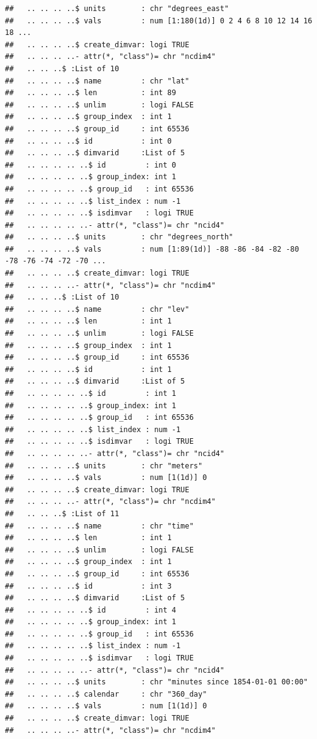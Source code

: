 \documentclass{article}\usepackage[]{graphicx}\usepackage[]{color}
\makeatletter
\newenvironment{kframe}{%
 \def\at@end@of@kframe{}%
 \ifinner\ifhmode%
  \def\at@end@of@kframe{\end{minipage}}%
  \begin{minipage}{\columnwidth}%
 \fi\fi%
 \def\FrameCommand##1{\hskip\@totalleftmargin \hskip-\fboxsep
 \colorbox{shadecolor}{##1}\hskip-\fboxsep
     \hskip-\linewidth \hskip-\@totalleftmargin \hskip\columnwidth}%
 \MakeFramed {\advance\hsize-\width
   \@totalleftmargin\z@ \linewidth\hsize
   \@setminipage}}%
 {\par\unskip\endMakeFramed%
 \at@end@of@kframe}
\newenvironment{knitrout}{}{} %
\makeatother
\begin{document}
\begin{knitrout}
\begin{kframe}
\begin{verbatim}
##   .. .. .. ..$ units        : chr "degrees_east"
##   .. .. .. ..$ vals         : num [1:180(1d)] 0 2 4 6 8 10 12 14 16 18 ...
##   .. .. .. ..$ create_dimvar: logi TRUE
##   .. .. .. ..- attr(*, "class")= chr "ncdim4"
##   .. .. ..$ :List of 10
##   .. .. .. ..$ name         : chr "lat"
##   .. .. .. ..$ len          : int 89
##   .. .. .. ..$ unlim        : logi FALSE
##   .. .. .. ..$ group_index  : int 1
##   .. .. .. ..$ group_id     : int 65536
##   .. .. .. ..$ id           : int 0
##   .. .. .. ..$ dimvarid     :List of 5
##   .. .. .. .. ..$ id         : int 0
##   .. .. .. .. ..$ group_index: int 1
##   .. .. .. .. ..$ group_id   : int 65536
##   .. .. .. .. ..$ list_index : num -1
##   .. .. .. .. ..$ isdimvar   : logi TRUE
##   .. .. .. .. ..- attr(*, "class")= chr "ncid4"
##   .. .. .. ..$ units        : chr "degrees_north"
##   .. .. .. ..$ vals         : num [1:89(1d)] -88 -86 -84 -82 -80 -78 -76 -74 -72 -70 ...
##   .. .. .. ..$ create_dimvar: logi TRUE
##   .. .. .. ..- attr(*, "class")= chr "ncdim4"
##   .. .. ..$ :List of 10
##   .. .. .. ..$ name         : chr "lev"
##   .. .. .. ..$ len          : int 1
##   .. .. .. ..$ unlim        : logi FALSE
##   .. .. .. ..$ group_index  : int 1
##   .. .. .. ..$ group_id     : int 65536
##   .. .. .. ..$ id           : int 1
##   .. .. .. ..$ dimvarid     :List of 5
##   .. .. .. .. ..$ id         : int 1
##   .. .. .. .. ..$ group_index: int 1
##   .. .. .. .. ..$ group_id   : int 65536
##   .. .. .. .. ..$ list_index : num -1
##   .. .. .. .. ..$ isdimvar   : logi TRUE
##   .. .. .. .. ..- attr(*, "class")= chr "ncid4"
##   .. .. .. ..$ units        : chr "meters"
##   .. .. .. ..$ vals         : num [1(1d)] 0
##   .. .. .. ..$ create_dimvar: logi TRUE
##   .. .. .. ..- attr(*, "class")= chr "ncdim4"
##   .. .. ..$ :List of 11
##   .. .. .. ..$ name         : chr "time"
##   .. .. .. ..$ len          : int 1
##   .. .. .. ..$ unlim        : logi FALSE
##   .. .. .. ..$ group_index  : int 1
##   .. .. .. ..$ group_id     : int 65536
##   .. .. .. ..$ id           : int 3
##   .. .. .. ..$ dimvarid     :List of 5
##   .. .. .. .. ..$ id         : int 4
##   .. .. .. .. ..$ group_index: int 1
##   .. .. .. .. ..$ group_id   : int 65536
##   .. .. .. .. ..$ list_index : num -1
##   .. .. .. .. ..$ isdimvar   : logi TRUE
##   .. .. .. .. ..- attr(*, "class")= chr "ncid4"
##   .. .. .. ..$ units        : chr "minutes since 1854-01-01 00:00"
##   .. .. .. ..$ calendar     : chr "360_day"
##   .. .. .. ..$ vals         : num [1(1d)] 0
##   .. .. .. ..$ create_dimvar: logi TRUE
##   .. .. .. ..- attr(*, "class")= chr "ncdim4"

\end{verbatim}
\end{kframe}
\end{knitrout}
\end{document}
